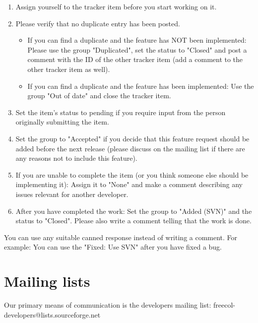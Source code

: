 \documentclass[12pt]{book}
\begin{document}
\begin{enumerate}
\item Assign yourself to the tracker item before you start working on it.

\item Please verify that no duplicate entry has been posted.

\begin{itemize}
\item If you can find a duplicate and the feature has NOT been
  implemented: Please use the group "Duplicated", set the status to
  "Closed" and post a comment with the ID of the other tracker item
  (add a comment to the other tracker item as well).

\item If you can find a duplicate and the feature has been
  implemented: Use the group "Out of date" and close the tracker item.
\end{itemize}

\item Set the item's status to pending if you require input from the person
   originally submitting the item.

\item Set the group to "Accepted" if you decide that this feature
   request should be added before the next release (please discuss on
   the mailing list if there are any reasons not to include this
   feature).

\item If you are unable to complete the item (or you think someone else
   should be implementing it): Assign it to "None" and make a comment
   describing any issues relevant for another developer.

\item After you have completed the work: Set the group to "Added (SVN)"
   and the status to "Closed". Please also write a comment telling that
   the work is done.
\end{enumerate}

You can use any suitable canned response instead of writing a comment.
For example: You can use the "Fixed: Use SVN" after you have fixed a bug.


\hypertarget{Mailing lists}{\section{Mailing lists}}

Our primary means of communication is the developers mailing list:
freecol-developers@lists.sourceforge.net
\end{document}
